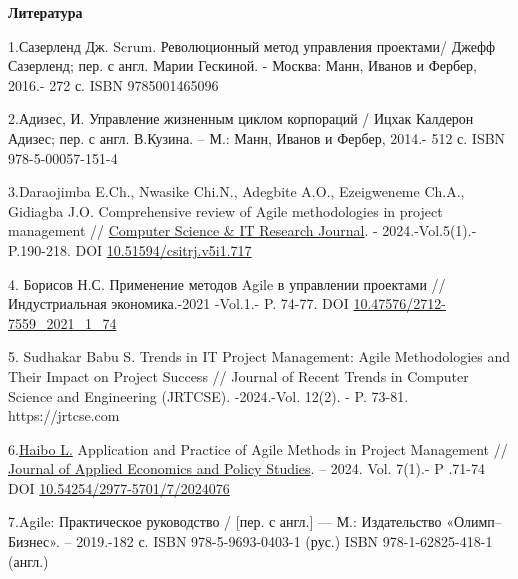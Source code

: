 \begin{center}
  {\bfseries Литература}
  \end{center}
  
  \begin{references}
1.Сазерленд Дж. Scrum. Революционный метод управления проектами/ Джефф
Сазерленд; пер. с англ. Марии Гескиной. - Москва: Манн, Иванов и Фербер,
2016.- 272 с. \linebreak ISBN 9785001465096

2.Адизес, И. Управление жизненным циклом корпораций / Ицхак Калдерон
Адизес; пер. с англ. В.Кузина. -- М.: Манн, Иванов и Фербер, 2014.- 512
с. ISBN 978-5-00057-151-4

3.Daraojimba E.Ch., Nwasike Chi.N., Adegbite A.O., Ezeigweneme Ch.A.,
Gidiagba J.O. Comprehensive review of Agile methodologies in project
management //
\href{https://www.researchgate.net/journal/Computer-Science-IT-Research-Journal-2709-0051?_tp=eyJjb250ZXh0Ijp7ImZpcnN0UGFnZSI6Il9kaXJlY3QiLCJwYWdlIjoicHVibGljYXRpb24iLCJwcmV2aW91c1BhZ2UiOiJfZGlyZWN0In19}{Computer
Science \& IT Research Journal}. - 2024.-Vol.5(1).- P.190-218. DOI
\href{http://dx.doi.org/10.51594/csitrj.v5i1.717}{10.51594/csitrj.v5i1.717}

4. Борисов Н.С. Применение методов Agile в управлении проектами //
Индустриальная экономика.-2021 -Vol.1.- P. 74-77. DOI
\href{https://doi.org/10.47576/2712-7559_2021_1_74}{10.47576/2712-7559\_2021\_1\_74}

5. Sudhakar Babu S. Trends in IT Project Management: Agile Methodologies
and Their Impact on Project Success // Journal of Recent Trends in
Computer Science and Engineering (JRTCSE). -2024.-Vol. 12(2). - P.
73-81. https://jrtcse.com

6.\href{https://www.researchgate.net/scientific-contributions/Haibo-Li-2290691805?_tp=eyJjb250ZXh0Ijp7ImZpcnN0UGFnZSI6Il9kaXJlY3QiLCJwYWdlIjoicHVibGljYXRpb24iLCJwcmV2aW91c1BhZ2UiOiJfZGlyZWN0In19}{Haibo
L.} Application and Practice of Agile Methods in Project Management //
\href{https://www.researchgate.net/journal/Journal-of-Applied-Economics-and-Policy-Studies-2977-571X?_tp=eyJjb250ZXh0Ijp7ImZpcnN0UGFnZSI6Il9kaXJlY3QiLCJwYWdlIjoicHVibGljYXRpb24iLCJwcmV2aW91c1BhZ2UiOiJfZGlyZWN0In19}{Journal
of Applied Economics and Policy Studies}. -- 2024. Vol. 7(1).- P .71-74
DOI
\href{http://dx.doi.org/10.54254/2977-5701/7/2024076}{10.54254/2977-5701/7/2024076}

7.Agile: Практическое руководство / {[}пер. с англ.{]} --- М.:
Издательство «Олимп--Бизнес». -- 2019.-182 с. ISBN 978-5-9693-0403-1
(рус.) ISBN 978-1-62825-418-1 (англ.)


\end{references}
